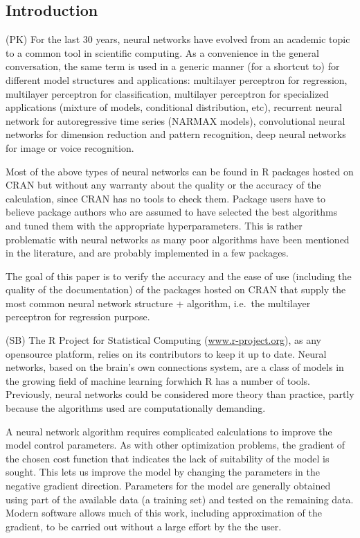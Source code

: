 \hypertarget{introduction}{%
\subsection{Introduction}\label{introduction}}

(PK) For the last 30 years, neural networks have evolved from an
academic topic to a common tool in scientific computing. As a
convenience in the general conversation, the same term is used in a
generic manner (for a shortcut to) for different model structures and
applications: multilayer perceptron for regression, multilayer
perceptron for classification, multilayer perceptron for specialized
applications (mixture of models, conditional distribution, etc),
recurrent neural network for autoregressive time series (NARMAX models),
convolutional neural networks for dimension reduction and pattern
recognition, deep neural networks for image or voice recognition.

Most of the above types of neural networks can be found in R packages
hosted on CRAN but without any warranty about the quality or the
accuracy of the calculation, since CRAN has no tools to check them.
Package users have to believe package authors who are assumed to have
selected the best algorithms and tuned them with the appropriate
hyperparameters. This is rather problematic with neural networks as many
poor algorithms have been mentioned in the literature, and are probably
implemented in a few packages.

The goal of this paper is to verify the accuracy and the ease of use
(including the quality of the documentation) of the packages hosted on
CRAN that supply the most common neural network structure + algorithm,
i.e.~the multilayer perceptron for regression purpose.

(SB) The R Project for Statistical Computing (\url{www.r-project.org}),
as any opensource platform, relies on its contributors to keep it up to
date. Neural networks, based on the brain's own connections system, are
a class of models in the growing field of machine learning forwhich R
has a number of tools. Previously, neural networks could be considered
more theory than practice, partly because the algorithms used are
computationally demanding.

A neural network algorithm requires complicated calculations to improve
the model control parameters. As with other optimization problems, the
gradient of the chosen cost function that indicates the lack of
suitability of the model is sought. This lets us improve the model by
changing the parameters in the negative gradient direction. Parameters
for the model are generally obtained using part of the available data (a
training set) and tested on the remaining data. Modern software allows
much of this work, including approximation of the gradient, to be
carried out without a large effort by the the user.

